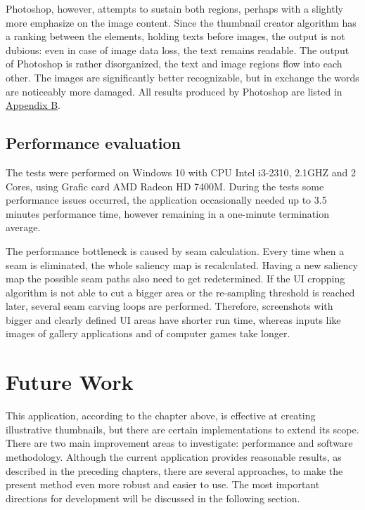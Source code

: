\documentclass[draft,final]{vutinfth} %
\begin{document}
	Photoshop, however, attempts to sustain both regions, perhaps with a slightly more emphasize on the image content.
	Since the thumbnail creator algorithm has a ranking between the elements, holding texts before images, the output is not dubious: even in case of image data loss, the text remains readable.
	The output of Photoshop is rather disorganized, the text and image regions flow into each other.
	The images are significantly better recognizable, but in exchange the words are noticeably more damaged. 
	All results produced by Photoshop are listed in \hyperref[AppB]{Appendix B}. 
	
	\section{Performance evaluation}
	The tests were performed on Windows 10 with CPU Intel i3-2310, 2.1GHZ and 2 Cores, using Grafic card AMD Radeon HD 7400M.
	During the tests some performance issues occurred, the application occasionally needed up to 3.5 minutes performance time, however remaining in a one-minute termination average.\par 
	The performance bottleneck is caused by seam calculation.
	Every time when a seam is eliminated, the whole saliency map is recalculated.
	Having a new saliency map the possible seam paths also need to get redetermined.
	If the UI cropping algorithm is not able to cut a bigger area or the re-sampling threshold is reached later, several seam carving loops are performed. 
	Therefore, screenshots with bigger and clearly defined UI areas have shorter run time, whereas inputs like images of gallery applications and of computer games take longer. 
	
	\chapter{Future Work}
	\label{futureWork}
	This application, according to the chapter above, is effective at creating illustrative thumbnails, but there are certain implementations to extend its scope. 
	There are two main improvement areas to investigate: performance and software methodology.
	Although the current application provides reasonable results, as described in the preceding chapters, there are several approaches, to make the present method even more robust and easier to use.
	The most important directions for development will be discussed in the following section.
	
\end{document}
